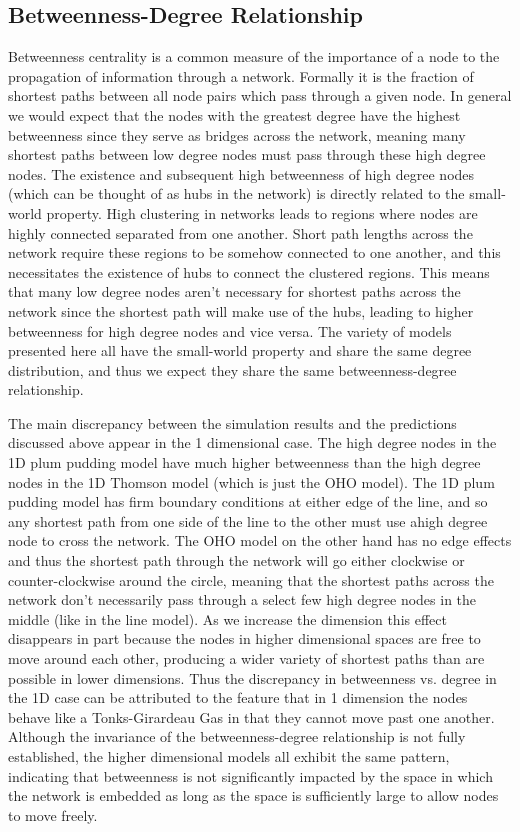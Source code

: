 \documentclass[aps,pre,reprint,superscriptaddress,amsmath,amssymb]{revtex4-1}
\begin{document}
\subsection{Betweenness-Degree Relationship}	%
Betweenness centrality is a common measure of the importance of a node to the propagation of information through a network.
Formally it is the fraction of shortest paths between all node pairs which pass through a given node.
In general we would expect that the nodes with the greatest degree have the highest betweenness since they serve as bridges across the network, meaning many shortest paths between low degree nodes must pass through these high degree nodes.
The existence and subsequent high betweenness of high degree nodes (which can be thought of as hubs in the network) is directly related to the small-world property.
High clustering in networks leads to regions where nodes are highly connected separated from one another.
Short path lengths across the network require these regions to be somehow connected to one another, and this necessitates the existence of hubs to connect the clustered regions.
This means that many low degree nodes aren't necessary for shortest paths across the network since the shortest path will make use of the hubs, leading to higher betweenness for high degree nodes and vice versa.
The variety of models presented here all have the small-world property and share the same degree distribution, and thus we expect they share the same betweenness-degree relationship.


The main discrepancy between the simulation results and the predictions discussed above appear in the 1 dimensional case.
The high degree nodes in the 1D plum pudding model have much higher betweenness than the high degree nodes in the 1D Thomson model (which is just the OHO model).
The 1D plum pudding model has firm boundary conditions at either edge of the line, and so any shortest path from one side of the line to the other must use ahigh degree node to cross the network.
The OHO model on the other hand has no edge effects and thus the shortest path through the network will go either clockwise or counter-clockwise around the circle, meaning that the shortest paths across the network don't necessarily pass through a select few high degree nodes in the middle (like in the line model).
As we increase the dimension this effect disappears in part because the nodes in higher dimensional spaces are free to move around each other, producing a wider variety of shortest paths than are possible in lower dimensions. 
Thus the discrepancy in betweenness vs. degree in the 1D case can be attributed to the feature that in 1 dimension the nodes behave like a Tonks-Girardeau Gas in that they cannot move past one another.
Although the invariance of the betweenness-degree relationship is not fully established, the higher dimensional models all exhibit the same pattern, indicating that betweenness is not significantly impacted by the space in which the network is embedded as long as the space is sufficiently large to allow nodes to move freely.
\end{document}
